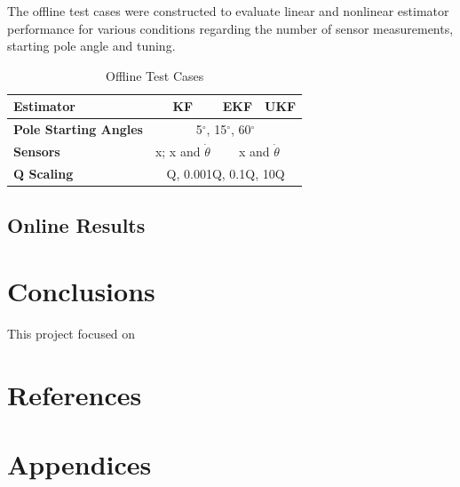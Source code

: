 \documentclass{article}
\begin{document}
The offline test cases were constructed to evaluate linear and nonlinear estimator performance for various conditions regarding the number of sensor measurements, starting pole angle and tuning.

\begin{table}[h!]
 \centering
 \renewcommand{\arraystretch}{1.5}
 \begin{tabular}{ |l |c  |c |c |}
 \hline
 	 \textbf{Estimator} & \textbf{KF} & \textbf{EKF} & \textbf{UKF} \\ \hline
 	 \textbf{Pole Starting Angles}  & \multicolumn{3}{|c|}{5$^{\circ}$, 15$^{\circ}$, 60$^{\circ}$} \\ \hline
 	 \textbf{Sensors} & x; x and $\dot\theta$ & \multicolumn{2}{|c|}{x and $\dot\theta$} \\ \hline
 	 \textbf{Q Scaling}  & \multicolumn{3}{|c|}{Q, 0.001Q, 0.1Q, 10Q} \\ \hline
 \end{tabular}
 \caption{Offline Test Cases}
 \label{table:offlinecases}
 \end{table}

\subsection{Online Results}

\section{Conclusions}
This project focused on 

\section{References}

{}


\pagebreak
\section{Appendices}
\end{document}
